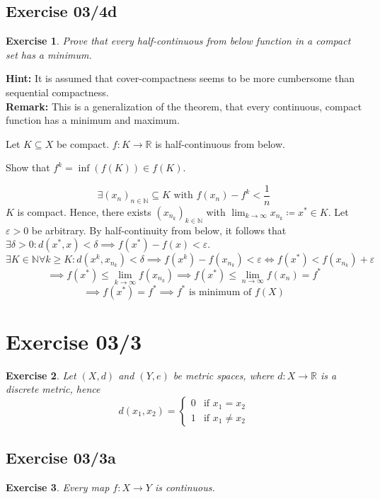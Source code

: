 \documentclass{article}
\newtheorem{ex}{Exercise} %
\begin{document}
\subsection{Exercise 03/4d}
\begin{ex}
  Prove that every half-continuous from below function in a compact set has a minimum.
\end{ex}

\textbf{Hint:} It is assumed that cover-compactness seems to be more cumbersome than sequential compactness. \\
\textbf{Remark:} This is a generalization of the theorem, that every continuous, compact function has a minimum and maximum.

Let $K \subseteq X$ be compact. $f: K \to \mathbb R$ is half-continuous from below.

Show that $f^k = \operatorname{inf}(f(K)) \in f(K)$.

\[ \exists (x_n)_{n\in\mathbb N} \subseteq K \text{ with } f(x_n) - f^k < \frac1n \]
$K$ is compact. Hence, there exists $(x_{n_k})_{k \in \mathbb N}$ with $\lim_{k\to\infty} x_{n_k} \coloneqq x^* \in K$.
Let $\varepsilon > 0$ be arbitrary.
By half-continuity from below, it follows that $\exists \delta > 0: d(x^*, x) < \delta \implies f(x^*) - f(x) < \varepsilon$.
\[ \exists K \in \mathbb N \forall k \geq K: d(x^k, x_{n_k}) < \delta \implies f(x^k) - f(x_{n_k}) < \varepsilon \iff f(x^*) < f(x_{n_k}) + \varepsilon \]
\[ \implies f(x^*) \leq \lim_{k\to\infty} f(x_{n_k}) \implies f(x^*) \leq \lim_{n\to\infty} f(x_n) = f^* \]
\[ \implies f(x^*) = f^* \implies f^* \text{ is minimum of } f(X) \]

\section{Exercise 03/3}
\begin{ex}
  Let $(X, d)$ and $(Y, e)$ be metric spaces, where $d: X \to \mathbb R$ is a discrete metric,
  hence
  \[
    d(x_1, x_2) = \begin{cases}
      0 & \text{if } x_1 = x_2 \\
      1 & \text{if } x_1 \neq x_2
    \end{cases}
  \]
\end{ex}

\subsection{Exercise 03/3a}
\begin{ex}
  Every map $f: X \to Y$ is continuous.
\end{ex}
\end{document}

